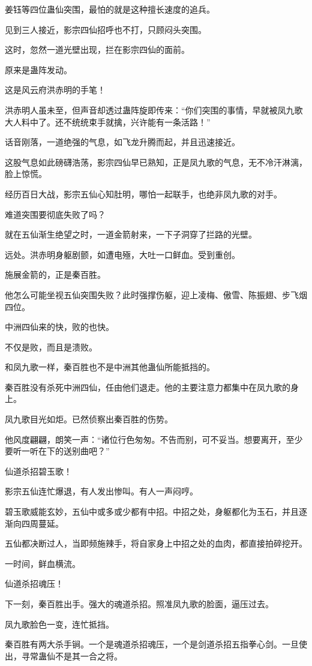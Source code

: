 \begin{this_body}
姜钰等四位蛊仙突围，最怕的就是这种擅长速度的追兵。

见到三人接近，影宗四仙招呼也不打，只顾闷头突围。

这时，忽然一道光壁出现，拦在影宗四仙的面前。

原来是蛊阵发动。

这是风云府洪赤明的手笔！

洪赤明人虽未至，但声音却透过蛊阵旋即传来：“你们突围的事情，早就被凤九歌大人料中了。还不统统束手就擒，兴许能有一条活路！”

话音刚落，一道绝强的气息，如飞龙升腾而起，并且迅速接近。

这股气息如此磅礴浩荡，影宗四仙早已熟知，正是凤九歌的气息，无不冷汗淋漓，脸上惊慌。

经历百日大战，影宗五仙心知肚明，哪怕一起联手，也绝非凤九歌的对手。

难道突围要彻底失败了吗？

就在五仙渐生绝望之时，一道金箭射来，一下子洞穿了拦路的光壁。

远处。洪赤明身躯剧颤，如遭电殛，大吐一口鲜血。受到重创。

施展金箭的，正是秦百胜。

他怎么可能坐视五仙突围失败？此时强撑伤躯，迎上凌梅、傲雪、陈振翅、步飞烟四位。

中洲四仙来的快，败的也快。

不仅是败，而且是溃败。

和凤九歌一样，秦百胜也不是中洲其他蛊仙所能抵挡的。

秦百胜没有杀死中洲四仙，任由他们退走。他的主要注意力都集中在凤九歌的身上。

凤九歌目光如炬。已然侦察出秦百胜的伤势。

他风度翩翩，朗笑一声：“诸位行色匆匆。不告而别，可不妥当。想要离开，至少要听一听在下的送别曲吧？”

仙道杀招碧玉歌！

影宗五仙连忙爆退，有人发出惨叫。有人一声闷哼。

碧玉歌威能玄妙，五仙中或多或少都有中招。中招之处，身躯都化为玉石，并且逐渐向四周蔓延。

五仙都决断过人，当即频施辣手，将自家身上中招之处的血肉，都直接拍碎挖开。

一时间，鲜血横流。

仙道杀招魂压！

下一刻，秦百胜出手。强大的魂道杀招。照准凤九歌的脸面，逼压过去。

凤九歌脸色一变，连忙抵挡。

秦百胜有两大杀手锏。一个是魂道杀招魂压，一个是剑道杀招五指拳心剑。一旦使出，寻常蛊仙不是其一合之将。


\end{this_body}
